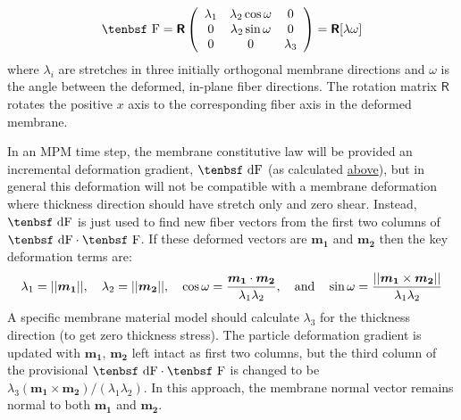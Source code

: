 \documentclass[11pt]{book}
\renewcommand{\vec}[1]{\boldsymbol{#1}}
\newcommand{\tens}[1]{\boldsymbol{\mathsf{#1}}}
\def\F{\hbox{\tenbsf F}}
\def\dF{\hbox{\tenbsf dF}}
\begin{document}
\begin{equation}
   \F = \tens{R}\left(\begin{array}{ccc}
          \lambda_1  & \lambda_2 \cos\omega & 0   \\
         0  & \lambda_2 \sin\omega & 0   \\
        0 & 0 & \lambda_3
        \end{array}\right)   = \tens{R}[\lambda\omega]
\end{equation}
where $\lambda_i$ are stretches in three initially orthogonal membrane directions and $\omega$ is the angle between the deformed, in-plane fiber directions. The rotation matrix $\tens{R}$ rotates the positive $x$ axis to the corresponding fiber axis in the deformed membrane.

In an MPM time step, the membrane constitutive law will be provided an incremental deformation gradient, $\dF$ (as calculated \hyperref[IDG]{above}), but in general this deformation will not be compatible with a membrane deformation where thickness direction should have stretch only and zero shear. Instead, $\dF$ is just used to find new fiber vectors from the first two columns of $\dF\cdot\F$. If these deformed vectors are $\vec{m_1}$ and $\vec{m_2}$ then the key deformation terms are:
\begin{equation}
     \lambda_1 = ||\vec{m_1}||, \quad \lambda_2 = ||\vec{m_2}||, \quad \cos\omega = {\vec{m_1}\cdot\vec{m_2}\over \lambda_1 \lambda_2},
     \quad {\rm and} \quad \sin\omega = {||\vec{m_1}\times\vec{m_2}||\over \lambda_1 \lambda_2}
\end{equation}
A specific membrane material model should calculate $\lambda_3$ for the thickness direction (to get zero thickness stress). The particle  deformation gradient is updated with $\vec{m_1}$, $\vec{m_2}$ left intact as first two columns, but the third column of the provisional $\dF\cdot\F$ is changed to be $\lambda_3(\vec{m_1}\times\vec{m_2})/(\lambda_1\lambda_2)$. In this approach, the membrane normal vector remains normal to both $\vec{m_1}$ and $\vec{m_2}$.
\end{document}
